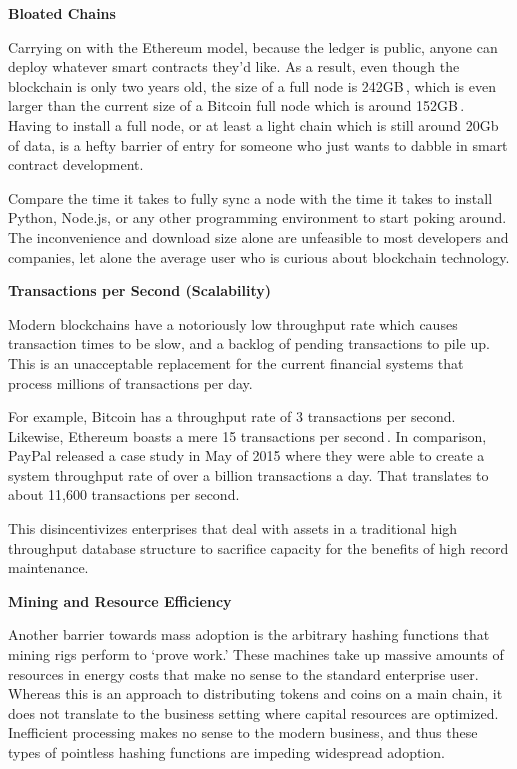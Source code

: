 \documentclass{%
	article}
\begin{document}
\begin{center}
\textbf{Bloated Chains}
\end{center}

Carrying on with the Ethereum model, because the ledger is public, anyone can deploy whatever smart contracts they’d like. As a result, even though the blockchain is only two years old, the size of a full node is 242GB\,\cite{ethchainsize}, which is even larger than the current size of a Bitcoin full node which is around 152GB\,\cite{btcchainsize}. Having to install a full node, or at least a light chain which is still around 20Gb of data, is a hefty barrier of entry for someone who just wants to dabble in smart contract development.

Compare the time it takes to fully sync a node with the time it takes to install Python, Node.js, or any other programming environment to start poking around. The inconvenience and download size alone are unfeasible to most developers and companies, let alone the average user who is curious about blockchain technology.

\begin{center}
\textbf{Transactions per Second (Scalability)}
\end{center}

Modern blockchains have a notoriously low throughput rate which causes transaction times to be slow, and a backlog of pending transactions to pile up. This is an unacceptable replacement for the current financial systems that process millions of transactions per day.

For example, Bitcoin has a throughput rate of 3 transactions per second. Likewise, Ethereum boasts a mere 15 transactions per second\,\cite{transactbandwidth}. In comparison, PayPal released a case study in May of 2015 where they were able to create a system throughput rate of over a billion transactions a day. That translates to about 11,600 transactions per second\cite{paypalcasestudy}.

This disincentivizes enterprises that deal with assets in a traditional high throughput database structure to sacrifice capacity for the benefits of high record maintenance.

\begin{center}
\textbf{Mining and Resource Efficiency}
\end{center}

Another barrier towards mass adoption is the arbitrary hashing functions that mining rigs perform to ‘prove work.’ These machines take up massive amounts of resources in energy costs that make no sense to the standard enterprise user. Whereas this is an approach to distributing tokens and coins on a main chain, it does not translate to the business setting where capital resources are optimized. Inefficient processing makes no sense to the modern business, and thus these types of pointless hashing functions are impeding widespread adoption.
\end{document}
